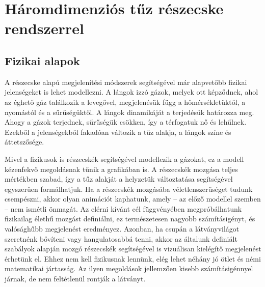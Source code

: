 






\section{Háromdimenziós tűz részecske rendszerrel}

\subsection{Fizikai alapok}
A részecske alapú megjelenítési módszerek segítségével már alapvetőbb fizikai jelenségeket is lehet modellezni. A lángok izzó gázok, melyek ott képződnek, ahol az éghető gáz találkozik a levegővel, megjelenésük függ a hőmérsékletüktől, a nyomástól és a sűrűségüktől. A lángok dinamikáját a terjedésük határozza meg. Ahogy a gázok terjednek, sűrűségük csökken, így a térfogatuk nő és lehűlnek. Ezekből a jelenségekből fakadóan változik a tűz alakja, a lángok színe és áttetszősége. 

Mivel a fizikusok is részecskék segítségével modellezik a gázokat, ez a modell kézenfekvő megoldásnak tűnik a grafikában is. A részecskék mozgása teljes mértékben szabad, így a tűz alakját a helyzetük változtatása segítségével egyszerűen formálhatjuk. Ha a részecskék mozgásába véletlenszerűséget tudunk csempészni, akkor olyan animációt kaphatunk, amely -- az előző modellel szemben --  nem ismétli önmagát. Az elérni kívánt cél függvényében megpróbálhatunk fizikailag élethű mozgást definiálni, ez természetesen nagyobb számításigényt, és valósághűbb megjelenést eredményez. Azonban, ha csupán a látványvilágot szeretnénk bővíteni vagy hangulatosabbá tenni, akkor az általunk definiált szabályok alapján mozgó részecskék segítségével is vizuálisan kielégítő megjelenést érhetünk el. Ehhez nem kell fizikusnak lennünk, elég lehet néhány jó ötlet és némi matematikai jártasság. Az ilyen megoldások jellemzően kisebb számításigénnyel járnak, de nem feltétlenül rontják a látványt. 

